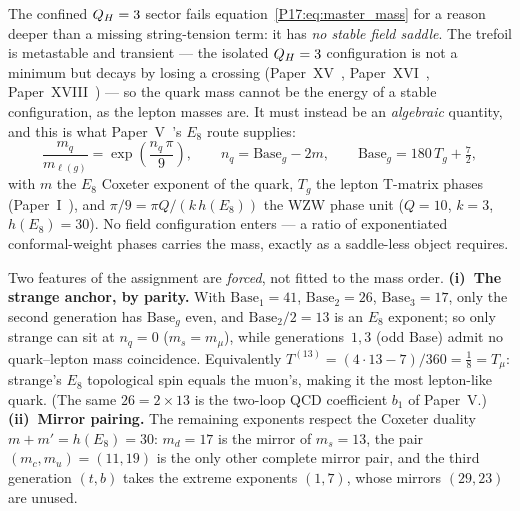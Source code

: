 \begin{remark}
\label{P17:rem:quark_mass_algebraic}
The confined $Q_H=3$ sector fails equation~\eqref{P17:eq:master_mass} for a
reason deeper than a missing string-tension term: it has \emph{no stable
field saddle}. The trefoil is metastable and transient --- the isolated
$Q_H=3$ configuration is not a minimum but decays by losing a crossing
(Paper~XV~\cite{Paper15}, Paper~XVI~\cite{Paper16}, Paper~XVIII~\cite{Paper18})
--- so the quark mass cannot be the energy of a stable configuration, as the
lepton masses are. It must instead be an \emph{algebraic} quantity, and this
is what Paper~V~\cite{Paper5}'s $E_8$ route supplies:
\begin{equation}
  \frac{m_q}{m_{\ell(g)}} = \exp\!\left(\frac{n_q\,\pi}{9}\right),
  \qquad
  n_q = \mathrm{Base}_g - 2m,
  \qquad
  \mathrm{Base}_g = 180\,T_g + \tfrac72,
  \label{P17:eq:e8_quark_ratio}
\end{equation}
with $m$ the $E_8$ Coxeter exponent of the quark, $T_g$ the lepton T-matrix
phases (Paper~I~\cite{Paper1}), and $\pi/9=\pi Q/(k\,h(E_8))$ the WZW phase
unit ($Q=10$, $k=3$, $h(E_8)=30$). No field configuration enters --- a ratio
of exponentiated conformal-weight phases carries the mass, exactly as a
saddle-less object requires.

Two features of the assignment are \emph{forced}, not fitted to the mass
order. \textbf{(i)~The strange anchor, by parity.} With
$\mathrm{Base}_1=41$, $\mathrm{Base}_2=26$, $\mathrm{Base}_3=17$, only the
second generation has $\mathrm{Base}_g$ even, and $\mathrm{Base}_2/2=13$ is
an $E_8$ exponent; so only strange can sit at $n_q=0$ ($m_s=m_\mu$), while
generations~$1,3$ (odd Base) admit no quark--lepton mass coincidence.
Equivalently $T^{(13)}=(4\cdot13-7)/360=\tfrac18=T_\mu$: strange's $E_8$
topological spin equals the muon's, making it the most lepton-like quark.
(The same $26=2\times13$ is the two-loop QCD coefficient $b_1$ of Paper~V.)
\textbf{(ii)~Mirror pairing.} The remaining exponents respect the Coxeter
duality $m+m'=h(E_8)=30$: $m_d=17$ is the mirror of $m_s=13$, the pair
$(m_c,m_u)=(11,19)$ is the only other complete mirror pair, and the third
generation $(t,b)$ takes the extreme exponents $(1,7)$, whose mirrors
$(29,23)$ are unused.


\end{remark}
